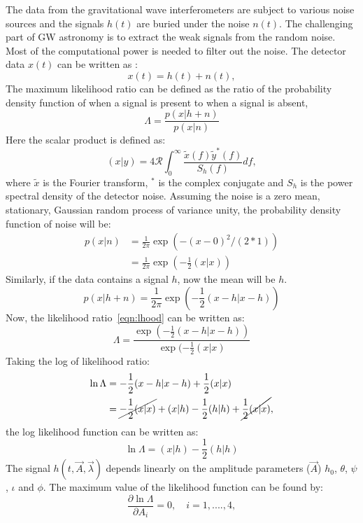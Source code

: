 \documentclass{ttuthes2007}
\begin{document}
The data from the gravitational wave interferometers are subject to various
noise sources and the signals $h(t)$ are buried under the noise $n(t)$. The challenging part
of \ac{GW} astronomy is to extract the weak signals from the random noise.
Most of the computational power is needed to filter out the noise. The
detector data $x(t)$ can be written as :
\begin{equation}
x(t) = h(t)+n(t),
\end{equation}
The maximum likelihood ratio can be defined as the ratio of the probability density function
of when a signal is present to when a signal is absent,
\begin{equation}\label{eqn:lhood}
\Lambda = \frac{p(x|h+n)}{p(x|n)}
\end{equation}
Here the scalar product is defined as:
\begin{equation}
(x|y)=4\mathcal{R} \int_{0}^{\infty}\frac{\tilde{x}(f)\tilde{y}^*(f)}{S_h(f)}df, 
\end{equation}
where $\tilde{x}$ is the Fourier transform, $^*$ is the complex conjugate and 
$S_h$ is the power spectral density of the detector noise.
Assuming the noise is a zero mean, stationary, Gaussian random process of
variance unity, the probability density function of noise will be:
\begin{align*}
p(x|n) & = \frac{1}{2\pi}\exp(-(x-0)^2/(2*1))\\
&= \frac{1}{2\pi} \exp(-\frac{1}{2}(x|x))
\end{align*}
Similarly, if the data contains a signal $h$, now the mean will be $h$.
\begin{equation}
p(x|h+n)=\frac{1}{2\pi} \exp(-\frac{1}{2}(x-h|x-h))
\end{equation}
Now, the likelihood ratio~\ref{eqn:lhood} can be written as:
\begin{equation}
\Lambda= \frac{\exp(-\frac{1}{2}(x-h|x-h))}{\exp(-\frac{1}{2}(x|x)}
\end{equation}
Taking the log of likelihood ratio:
\begin{align*}
\ln{\Lambda} & =-\frac{1}{2}(x-h|x-h) + \frac{1}{2}(x|x)\\
& = \cancel{-\frac{1}{2}(x|x)}
+(x|h)-\frac{1}{2}(h|h)+\cancel{\frac{1}{2}(x|x)},
\end{align*}
the log likelihood function can be written as:
\begin{equation}
\ln{\Lambda}=(x|h)-\frac{1}{2}(h|h)
\end{equation}
The signal $h(t,\vec{A},\vec{\lambda})$ depends linearly on the amplitude
parameters ($\vec{A}$) $h_0$, $\theta$, $\psi$, $\iota$ and $\phi$. The maximum
value of the likelihood function can be found by:
\begin{equation}
\frac{\partial\ln\Lambda}{\partial A_i}= 0, \quad i=1,....,4,  
\end{equation}
\end{document}

